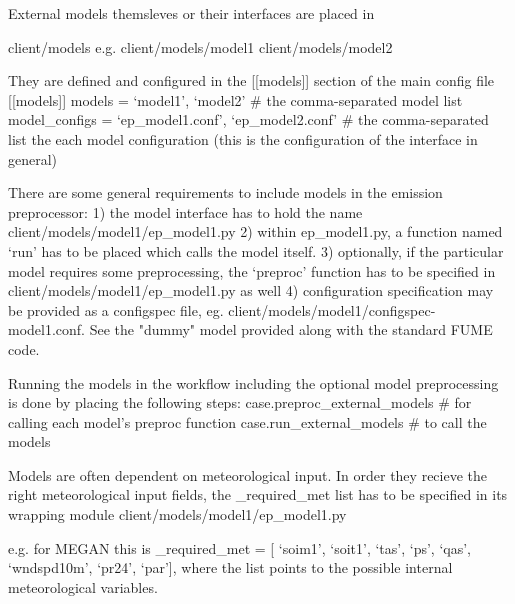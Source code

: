 \documentclass[a4paper,11pt]{article}
\begin{document}
External models themsleves or their interfaces are placed in

client/models e.g. client/models/model1 client/models/model2

They are defined and configured in the {[}{[}models{]}{]} section of the
main config file {[}{[}models{]}{]} models = `model1', `model2' \# the
comma-separated model list model\_configs = `ep\_model1.conf',
`ep\_model2.conf' \# the comma-separated list the each model
configuration (this is the configuration of the interface in general)

There are some general requirements to include models in the emission
preprocessor: 1) the model interface has to hold the name
client/models/model1/ep\_model1.py 2) within ep\_model1.py, a function
named `run' has to be placed which calls the model itself. 3)
optionally, if the particular model requires some preprocessing, the
`preproc' function has to be specified in
client/models/model1/ep\_model1.py as well 4) configuration
specification may be provided as a configspec file, eg.
client/models/model1/configspec-model1.conf. 
See the "dummy" model provided along with the standard FUME code.

Running the models in the workflow including the optional model
preprocessing is done by placing the following steps:
case.preproc\_external\_models \# for calling each model's preproc
function case.run\_external\_models \# to call the models

Models are often dependent on meteorological input. In order they
recieve the right meteorological input fields, the \_required\_met list
has to be specified in its wrapping module client/models/model1/ep\_model1.py

e.g. for MEGAN this is \_required\_met = {[} `soim1', `soit1', `tas',
`ps', `qas', `wndspd10m', `pr24', `par'{]}, where the list points to the
possible internal meteorological variables.
\end{document}
